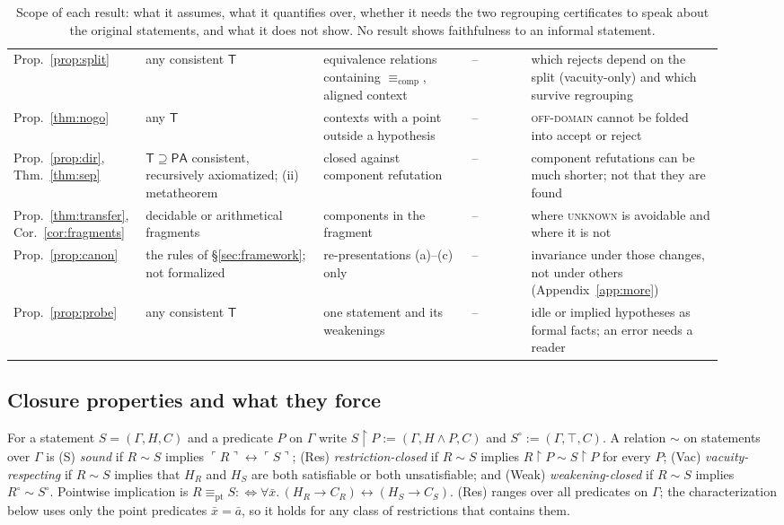 \documentclass[10pt]{article}
\theoremstyle{definition}
\newcommand{\T}{\mathsf{T}}
\newcommand{\Cl}[1]{\ulcorner #1 \urcorner}
\newcommand{\Ecomp}{\mathrel{\equiv_{\mathrm{comp}}}}
\newcommand{\Epi}{\mathrel{\equiv_{\mathrm{pt}}}}
\newcommand{\V}[1]{\textsc{#1}}
\begin{document}
\begin{table}[h]
\begin{tabular}{p{0.14\linewidth}p{0.24\linewidth}p{0.2\linewidth}p{0.08\linewidth}p{0.26\linewidth}}
Prop.~\ref{prop:split} & any consistent $\T$ & equivalence relations containing $\Ecomp$, aligned context & -- & which rejects depend on the split (vacuity-only) and which survive regrouping\\
Prop.~\ref{thm:nogo} & any $\T$ & contexts with a point outside a hypothesis & -- & \V{off-domain} cannot be folded into accept or reject\\
Prop.~\ref{prop:dir}, Thm.~\ref{thm:sep} & $\T\supseteq\mathsf{PA}$ consistent, recursively axiomatized; (ii) metatheorem & closed against component refutation & -- & component refutations can be much shorter; not that they are found\\
Prop.~\ref{thm:transfer}, Cor.~\ref{cor:fragments} & decidable or arithmetical fragments & components in the fragment & -- & where \V{unknown} is avoidable and where it is not\\
Prop.~\ref{prop:canon} & the rules of \S\ref{sec:framework}; not formalized & re-presentations (a)--(c) only & -- & invariance under those changes, not under others (Appendix~\ref{app:more})\\
Prop.~\ref{prop:probe} & any consistent $\T$ & one statement and its weakenings & -- & idle or implied hypotheses as formal facts; an error needs a reader\\
\bottomrule
\end{tabular}
\caption{Scope of each result: what it assumes, what it quantifies over, whether it needs the two
regrouping certificates to speak about the original statements, and what it does not show. No
result shows faithfulness to an informal statement.}
\label{tab:scope}
\end{table}

\subsection{Closure properties and what they force}\label{sec:axioms}

For a statement $S=(\Gamma,H,C)$ and a predicate $P$ on $\Gamma$ write
$S{\restriction}P:=(\Gamma,H\wedge P,C)$ and $S^{\circ}:=(\Gamma,\top,C)$. A relation $\sim$ on
statements over $\Gamma$ is
(S) \emph{sound} if $R\sim S$ implies $\Cl R\leftrightarrow\Cl S$;
(Res) \emph{restriction-closed} if $R\sim S$ implies $R{\restriction}P\sim S{\restriction}P$ for every $P$;
(Vac) \emph{vacuity-respecting} if $R\sim S$ implies that $H_R$ and $H_S$ are both satisfiable or
both unsatisfiable; and
(Weak) \emph{weakening-closed} if $R\sim S$ implies $R^{\circ}\sim S^{\circ}$.
Pointwise implication is $R\Epi S:\iff\forall\bar x.\,(H_R\to C_R)\leftrightarrow(H_S\to C_S)$.
(Res) ranges over all predicates on $\Gamma$; the characterization below uses only the point
predicates $\bar x=\bar a$, so it holds for any class of restrictions that contains them.
\end{document}
